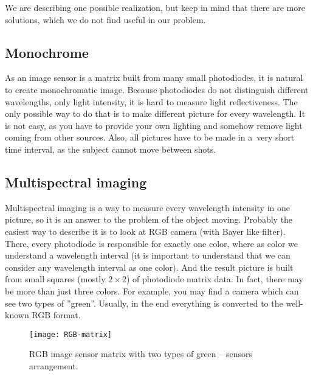        We are describing one possible realization, but keep in mind that
        there are more solutions, which we do not find useful in our problem.

        \subsection*{Monochrome}
            As an image sensor is a matrix built from many small photodiodes,
            it is natural to create monochromatic image.
            Because photodiodes do not distinguish different
            wavelengths, only light intensity, it is hard
            to measure light reflectiveness.
            The only possible way to do that is to
            make different picture for every wavelength.
            It is not easy, as you have to
            provide your own lighting and somehow remove
            light coming from other sources.
            Also, all pictures have to be made in
            a~very short time interval, as the subject
            cannot move between shots.

        \subsection*{Multispectral imaging}
            Multispectral imaging is a way to measure every wavelength intensity
            in one picture, so it is an answer to the problem of the object moving.
            Probably the easiest way to describe it is to look at RGB camera (with Bayer like filter\cite{bayerfilter}).
            There, every photodiode is responsible for exactly one color,
            where as color we understand a wavelength interval (it is important
            to understand that we can consider any wavelength interval as one color).
            And the result picture is built from small squares (mostly $2 \times 2$)
            of photodiode matrix data.
            In fact, there may be more than just three colors.
            For example, you may find a camera which can see two types of ''green''.
            Usually, in the end everything is converted to the well-known RGB format.

            \begin{figure}[H]
                \caption{RGB image sensor matrix with two types of green -- sensors arrangement.}
                \centering
                \texttt{[image: RGB-matrix]}
                \label{fig:RGB-matrix}
            \end{figure}

